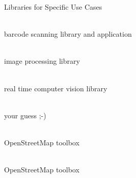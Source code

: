 \documentclass[aspectratio=169]{beamer}
\newcommand{\surl}[1] {{\tiny \url{#1}}}
\begin{document}
  \begin{frame}{Libraries for Specific Use Cases}
      \begin{description}
        \item<1->[ZXing \surl{http://code.google.com/p/zxing/}] \hfill \\ barcode scanning library and application
        \item<2->[Jon's Java Imaging Library \surl{http://code.google.com/p/jjil/}] \hfill \\ image processing library
        \item<3->[OpenCV-Android \surl{http://billmccord.github.com/OpenCV-Android/}] \hfill \\ real time computer vision library
        \item<4->[Facebook Android SDK \surl{https://github.com/facebook/facebook-android-sdk}] \hfill \\ your guess ;-)
        \item<5->[MapsForge \surl{http://code.google.com/p/mapsforge/}] \hfill \\ OpenStreetMap toolbox
        \item<6->[OSMDroid \surl{http://code.google.com/p/osmdroid/}] \hfill \\ OpenStreetMap toolbox
      \end{description}
    \end{frame}
\end{document}
